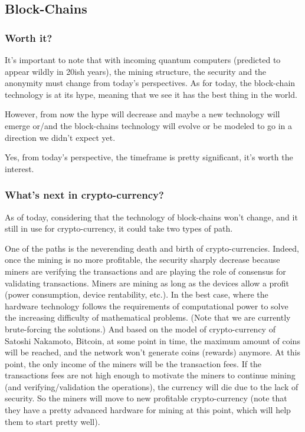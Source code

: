 
\subsection{Block-Chains}
\subsubsection{Worth it?}
It's important to note that with incoming quantum computers (predicted to appear wildly in 20ish years), the mining structure, the security and the anonymity must change from today's perspectives. 
As for today, the block-chain technology is at its hype, meaning that we see it has the best thing in the world.

However, from now the hype will decrease and maybe a new technology will emerge or/and the block-chains technology will evolve or be modeled to go in a direction we didn't expect yet.

Yes, from today's perspective, the timeframe is pretty significant, it's worth the interest.

\subsubsection{What's next in crypto-currency?}

As of today, considering that the technology of block-chains won't change, and it still in use for crypto-currency, it could take two types of path.

One of the paths is the neverending death and birth of crypto-currencies. Indeed, once the mining is no more profitable, the security sharply decrease because miners are verifying the transactions and are playing the role of consensus for validating transactions. Miners are mining as long as the devices allow a profit (power consumption, device rentability, etc.). In the best case, where the hardware technology follows the requirements of computational power to solve the increasing difficulty of mathematical problems. (Note that we are currently brute-forcing the solutions.) And based on the model of crypto-currency of Satoshi Nakamoto, Bitcoin, at some point in time, the maximum amount of coins will be reached, and the network won't generate coins (rewards) anymore. At this point, the only income of the miners will be the transaction fees. If the transactions fees are not high enough to motivate the miners to continue mining (and verifying/validation the operations), the currency will die due to the lack of security. So the miners will move to new profitable crypto-currency (note that they have a pretty advanced hardware for mining at this point, which will help them to start pretty well).

